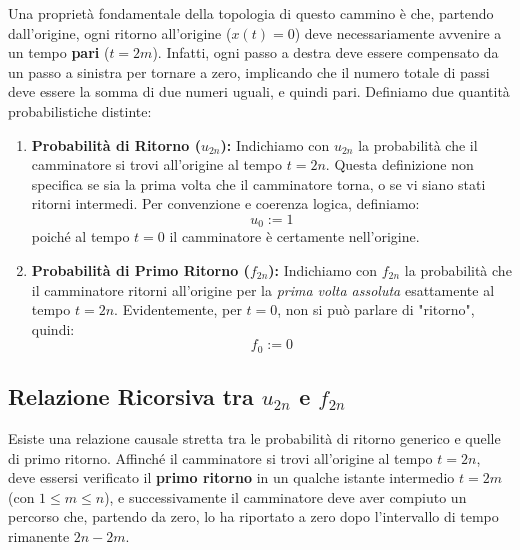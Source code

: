 Una proprietà fondamentale della topologia di questo cammino è che, partendo dall'origine, ogni ritorno all'origine ($x(t)=0$) deve necessariamente avvenire a un tempo \textbf{pari} ($t=2m$). Infatti, ogni passo a destra deve essere compensato da un passo a sinistra per tornare a zero, implicando che il numero totale di passi deve essere la somma di due numeri uguali, e quindi pari. Definiamo due quantità probabilistiche distinte:

\begin{enumerate}
    \item \textbf{Probabilità di Ritorno ($u_{2n}$):}
    Indichiamo con $u_{2n}$ la probabilità che il camminatore si trovi all'origine al tempo $t=2n$.
    Questa definizione non specifica se sia la prima volta che il camminatore torna, o se vi siano stati ritorni intermedi.
    Per convenzione e coerenza logica, definiamo:
    \begin{equation}
        u_0 := 1
    \end{equation}
    poiché al tempo $t=0$ il camminatore è certamente nell'origine.

    \item \textbf{Probabilità di Primo Ritorno ($f_{2n}$):}
    Indichiamo con $f_{2n}$ la probabilità che il camminatore ritorni all'origine per la \textit{prima volta assoluta} esattamente al tempo $t=2n$.
    Evidentemente, per $t=0$, non si può parlare di "ritorno", quindi:
    \begin{equation}
        f_0 := 0
    \end{equation}
\end{enumerate}

\subsection{Relazione Ricorsiva tra $u_{2n}$ e $f_{2n}$}

Esiste una relazione causale stretta tra le probabilità di ritorno generico e quelle di primo ritorno. Affinché il camminatore si trovi all'origine al tempo $t=2n$, deve essersi verificato il \textbf{primo ritorno} in un qualche istante intermedio $t=2m$ (con $1 \le m \le n$), e successivamente il camminatore deve aver compiuto un percorso che, partendo da zero, lo ha riportato a zero dopo l'intervallo di tempo rimanente $2n - 2m$.


